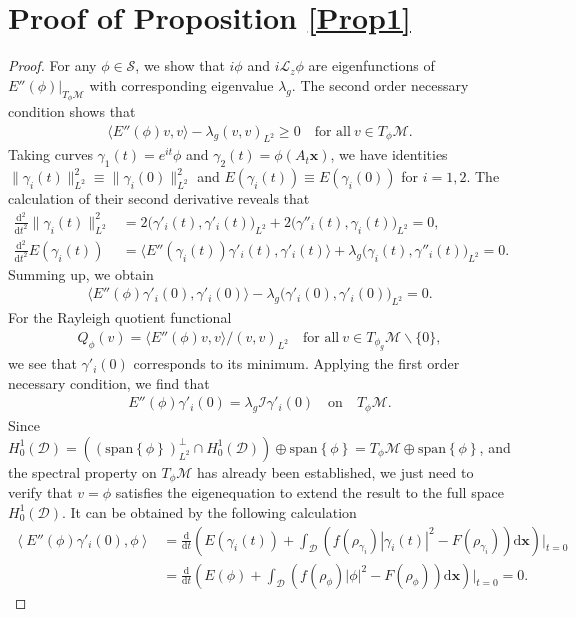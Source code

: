\documentclass[preprint,3p]{elsarticle}
\begin{document}
\section{Proof of {\bf Proposition } \ref{Prop1}}\label{Appendix_Pro}
\begin{proof} 
	For any $\phi\in\mathcal{S}$, we show that $i\phi$ and $i\mathcal{L}_z\phi$ are eigenfunctions of $E''(\phi)|_{T_{\phi}\mathcal{M}}$ with corresponding eigenvalue $\lambda_g$. The second order necessary condition shows that
	\begin{align*}
		\big\langle E''(\phi)v,v\big\rangle-\lambda_g(v,v)_{L^2}\ge0\quad \text{for all}\ v\in T_{\phi}\mathcal{M}.
	\end{align*}
	Taking curves $\gamma_1(t)=e^{it}\phi$ and $\gamma_2(t)=\phi(A_t\bm{x})$, we have identities $\big\|\gamma_i(t)\big\|_{L^2}^2\equiv\big\|\gamma_i(0)\big\|_{L^2}^2$ and $E(\gamma_i(t))\equiv E(\gamma_i(0))$ for $i=1,2$. The calculation of their second derivative reveals that
	\begin{align*}
		\frac{\text{d}^2}{\text{d}t^2}\big\|\gamma_i(t)\big\|_{L^2}^2&=2\big(\gamma'_i(t),\gamma'_i(t)\big)_{L^2}+2\big(\gamma''_i(t),\gamma_i(t)\big)_{L^2}=0,\\
		\frac{\text{d}^2}{\text{d}t^2}E(\gamma_i(t))&=\big\langle E''(\gamma_i(t))\gamma'_i(t),\gamma'_i(t)\big\rangle+\lambda_g\big( \gamma_i(t),\gamma''_i(t)\big)_{L^2}=0.
	\end{align*}
	Summing up, we obtain
	\begin{align*}
		\big\langle E''(\phi)\gamma'_i(0),\gamma'_i(0)\big\rangle-\lambda_g\big( \gamma'_i(0),\gamma'_i(0)\big)_{L^2}=0.
	\end{align*}
	For the Rayleigh quotient functional 
	\begin{align*}
		Q_{\phi}(v)=\big\langle E''(\phi)v,v\big\rangle\big/(v,v)_{L^2}\quad \text{for all}\ v\in T_{\phi_g}\mathcal{M}\backslash\{0\}, 
	\end{align*}
	we see that $\gamma'_i(0)$ corresponds to its minimum. Applying the first order necessary condition, we find that
	\begin{align*}
		E''(\phi)\gamma'_i(0)=\lambda_g\mathcal{I}\gamma'_i(0)\quad \text{on}\quad  T_{\phi}\mathcal{M}.
	\end{align*}
	Since $H_0^1(\mathcal{D})=\left(\left(\text{span}\left\{\phi\right\}\right)^{\bot}_{L^2}\cap H_0^1(\mathcal{D})\right)\oplus\text{span}\left\{\phi\right\}=T_{\phi}\mathcal{M}\oplus\text{span}\left\{\phi\right\}$, {and the spectral property on $T_\phi\mathcal{M}$ has already been established, we just need to verify that $v=\phi$ satisfies the eigenequation to extend the result to the full space $H_0^1(\mathcal{D})$.} It can be obtained by the following calculation
	\begin{align*}
		\left\langle E''(\phi)\gamma'_i(0),\phi\right\rangle
		&=\frac{\text{d}}{\text{d}t}\left( E(\gamma_i(t))+\int_{\mathcal{D}}\left(f(\rho_{\gamma_i})|\gamma_i(t)|^2-F(\rho_{\gamma_i})\right)\text{d}\bm{x}\right)\Bigg|_{t=0}\\
		&=\frac{\text{d}}{\text{d}t}\left( E(\phi)+\int_{\mathcal{D}}\left(f(\rho_{\phi})|\phi|^2-F(\rho_{\phi})\right)\text{d}\bm{x}\right)\Bigg|_{t=0}=0.
	\end{align*}
\end{proof}
\end{document}
